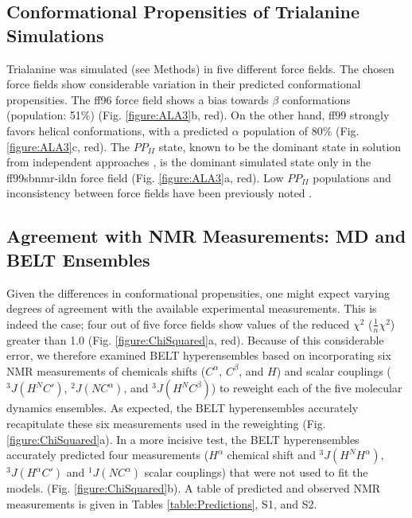 \documentclass[12pt]{article}
\begin{document}
\subsection*{Conformational Propensities of Trialanine Simulations}

Trialanine was simulated (see Methods) in five different force fields.  The chosen force fields show considerable variation in their predicted conformational propensities.  The ff96 force field shows a bias towards $\beta$ conformations (population: 51\%) (Fig. \ref{figure:ALA3}b, red).  On the other hand, ff99 strongly favors helical conformations, with a predicted $\alpha$ population of 80\% (Fig. \ref{figure:ALA3}c, red).  The $PP_{II}$ state, known to be the dominant state in solution from independent approaches \cite{Grdadolnik2011, Graf2007, Avbelj2006}, is the dominant simulated state only in the ff99sbnmr-ildn force field (Fig. \ref{figure:ALA3}a, red).  Low $PP_{II}$ populations and inconsistency between force fields have been previously noted \cite{Graf2007, beauchamp2012protein, nerenberg2011, best2008}.  

\subsection*{Agreement with NMR Measurements: MD and BELT Ensembles}

Given the differences in conformational propensities, one might expect varying degrees of agreement with the available experimental measurements.  This is indeed the case; four out of five force fields show values of the reduced $\chi^2$ ($\frac{1}{n} \chi^2$) greater than 1.0 (Fig. \ref{figure:ChiSquared}a, red).  Because of this considerable error, we therefore examined BELT hyperensembles based on incorporating six NMR measurements of chemicals shifts ($C^\alpha$, $C^\beta$, and $H$) and scalar couplings ($^3J(H^N C')$,  $^2J(N C^\alpha)$, and $^3J(H^N C^\beta)$) to reweight each of the five molecular dynamics ensembles.  As expected, the BELT hyperensembles accurately recapitulate these six measurements used in the reweighting (Fig.  \ref{figure:ChiSquared}a).  In a more incisive test, the BELT hyperensembles accurately predicted four measurements ($H^\alpha$ chemical shift and $^3J(H^N H^\alpha)$, $^3J(H^\alpha C')$ and $^1J(N C^\alpha)$ scalar couplings) that were not used to fit the models.    
(Fig. \ref{figure:ChiSquared}b).  
A table of predicted and observed NMR measurements is given in Tables \ref{table:Predictions}, S1, and S2.  
\end{document}
